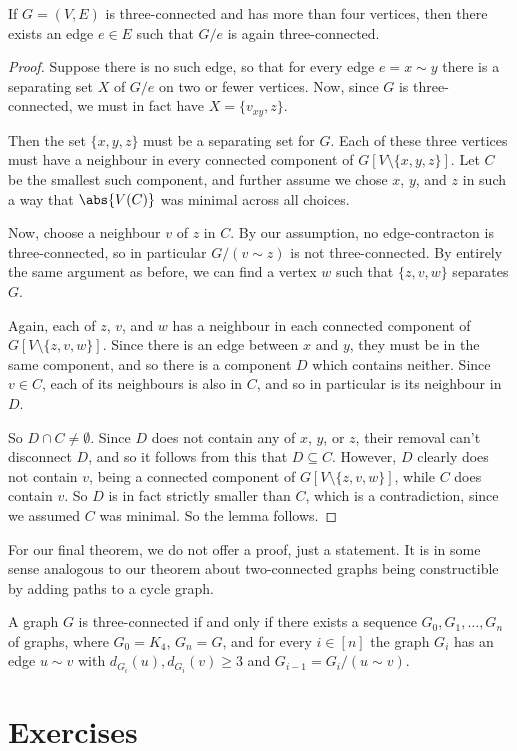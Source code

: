 \documentclass[nobib]{tufte-handout}
\begin{document}
\begin{lemma}
  If $G = (V,E)$ is three-connected and has more than four vertices, then there exists an edge $e \in E$ such that $G/e$ is again three-connected.

  \begin{proof}
    Suppose there is no such edge, so that for every edge $e = x \sim y$ there is a separating set $X$ of $G/e$ on two or fewer vertices. Now, since $G$ is three-connected, we must in fact have $X = \{v_{xy}, z\}$.

    Then the set $\{x, y, z\}$ must be a separating set for $G$. Each of these three vertices must have a neighbour in every connected component of $G[V \setminus \{x,y,z\}]$. Let $C$ be the smallest such component, and further assume we chose $x$, $y$, and $z$ in such a way that $\abs{V(C)}$ was minimal across all choices.

    Now, choose a neighbour $v$ of $z$ in $C$. By our assumption, no edge-contracton is three-connected, so in particular $G/(v \sim z)$ is not three-connected. By entirely the same argument as before, we can find a vertex $w$ such that $\{z,v,w\}$ separates $G$.

    Again, each of $z$, $v$, and $w$ has a neighbour in each connected component of $G[V \setminus \{z, v, w\}]$. Since there is an edge between $x$ and $y$, they must be in the same component, and so there is a component $D$ which contains neither. Since $v \in C$, each of its neighbours is also in $C$, and so in particular is its neighbour in $D$.

    So $D \cap C \neq \emptyset$. Since $D$ does not contain any of $x$, $y$, or $z$, their removal can't disconnect $D$, and so it follows from this that $D \subseteq C$. However, $D$ clearly does not contain $v$, being a connected component of $G[V \setminus \{z, v, w\}]$, while $C$ does contain $v$. So $D$ is in fact strictly smaller than $C$, which is a contradiction, since we assumed $C$ was minimal. So the lemma follows.
  \end{proof}
\end{lemma}

For our final theorem, we do not offer a proof, just a statement. It is in some sense analogous to our theorem about two-connected graphs being constructible by adding paths to a cycle graph.

\begin{theorem}[Tutte, 1961]
  A graph $G$ is three-connected if and only if there exists a sequence $G_0, G_1,\ldots, G_n$ of graphs, where $G_0 = K_4$, $G_n = G$, and for every $i \in [n]$ the graph $G_i$ has an edge $u \sim v$ with $d_{G_i}(u), d_{G_i}(v) \geq 3$ and $G_{i-1} = G_i/(u\sim v)$.
\end{theorem}

\section{Exercises}


%
%
\end{document}
